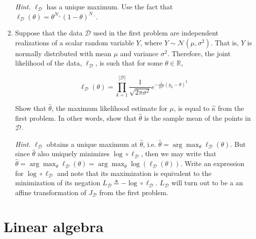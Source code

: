 \documentclass{article}
\numberwithin{equation}{section}
\begin{document}
\begin{enumerate}
    \textit{Hint.} $ \ell_\mathcal{D} $ has a unique
    maximum. Use the fact that $ \ell_\mathcal{D}(\theta) =
    \theta^{N_+}(1 - \theta)^{N_-} $.

    \item
    Suppose that the data $ \mathcal{D} $ used in the first problem are
    independent realizations of a scalar random variable $ Y $, where
    $ Y \sim \mathcal{N}(\mu, \sigma^2) $. That is, $ Y $ is normally
    distributed with mean $ \mu $ and variance $ \sigma^2 $. Therefore, the
    joint likelihood of the data, $ \ell_\mathcal{D} $, is such that for some
    $ \theta \in \mathbb{R} $,

    \begin{equation*}
        \ell_\mathcal{D}(\theta) = \prod_{k = 1}^{|\mathcal{D}|}
        \frac{1}{\sqrt{2\pi\sigma^2}}e^{-\frac{1}{2\sigma^2}(y_k - \theta)^2}
    \end{equation*}
    
    Show that $ \hat{\theta} $, the maximum likelihood estimate for $ \mu $, is
    equal to $ \hat{\kappa} $ from the first problem. In other words, show that
    $ \hat{\theta} $ is the sample mean of the points in $ \mathcal{D} $.

    \medskip

    \textit{Hint.} $ \ell_\mathcal{D} $ obtains a unique maximum at
    $ \hat{\theta} $, i.e. $ \hat{\theta} = \arg\max_\theta
    \ell_\mathcal{D}(\theta) $. But since $ \hat{\theta} $ also uniquely
    minimizes $ \log \circ \ell_\mathcal{D} $, then we may write
    that\footnotemark{} $ \hat{\theta} = \arg\max_\theta\ell_\mathcal{D}(\theta) =
    \arg\max_\theta\log(\ell_\mathcal{D}(\theta)) $. Write an expression for
    $ \log\circ\ell_\mathcal{D} $ and note that its maximization is equivalent
    to the minimization of its negation $ L_\mathcal{D} \triangleq
    -\log\circ\ell_\mathcal{D} $. $ L_\mathcal{D} $ will turn out to be a an
    affine transformation of $ J_\mathcal{D} $ from the first problem.
\end{enumerate}

\section{Linear algebra}
\end{document}
